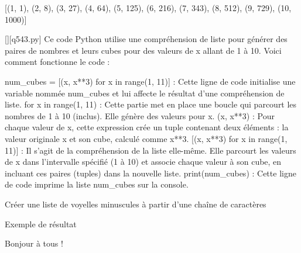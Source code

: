 [(1, 1), (2, 8), (3, 27), (4, 64), (5, 125), (6, 216), (7, 343), (8, 512), (9, 729), (10, 1000)]
        \par
        \begin{solution}
            \renewcommand{\nomfichier}{q543.py}
            \pythonfile{\chemincode \nomfichier}[][\nomfichier]
            Ce code Python utilise une compréhension de liste pour générer des paires de nombres et leurs cubes pour des valeurs de x allant de 1 à 10. Voici comment fonctionne le code :

    num_cubes = [(x, x**3) for x in range(1, 11)] : Cette ligne de code initialise une variable nommée num_cubes et lui affecte le résultat d'une compréhension de liste.
        for x in range(1, 11) : Cette partie met en place une boucle qui parcourt les nombres de 1 à 10 (inclus). Elle génère des valeurs pour x.
        (x, x**3) : Pour chaque valeur de x, cette expression crée un tuple contenant deux éléments : la valeur originale x et son cube, calculé comme x**3.
        [(x, x**3) for x in range(1, 11)] : Il s'agit de la compréhension de la liste elle-même. Elle parcourt les valeurs de x dans l'intervalle spécifié (1 à 10) et associe chaque valeur à son cube, en incluant ces paires (tuples) dans la nouvelle liste.
    print(num_cubes) : Cette ligne de code imprime la liste num_cubes sur la console.
        \end{solution}
        

        \question
        Créer une liste de voyelles minuscules à partir d'une chaîne de caractères

Exemple de résultat

Bonjour à tous !

